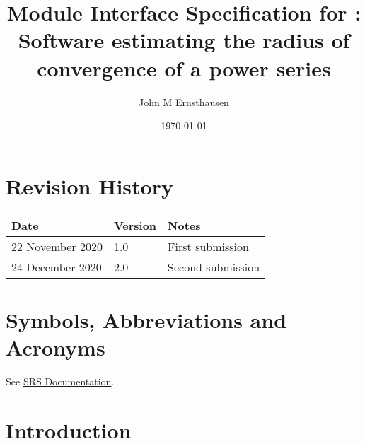 \documentclass[12pt, titlepage]{article}
\begin{document}
\title{Module Interface Specification for : Software estimating the radius of convergence of
a power series}
\author{John M Ernsthausen}
\date{\today}

\maketitle


\section{Revision History}

\begin{tabularx}{\textwidth}{p{4cm}p{2cm}X}
\toprule {\bf Date} & {\bf Version} & {\bf Notes}\\
\midrule
  22 November 2020 & 1.0 & First submission\\
  24 December 2020 & 2.0 & Second submission\\
\bottomrule
\end{tabularx}

\newpage

\section{Symbols, Abbreviations and Acronyms}

See \href{https://github.com/JohnErnsthausen/roc/blob/master/docs/SRS/SRS.pdf}{SRS Documentation}.

\newpage

\tableofcontents

\newpage


\section{Introduction}
\end{document}
